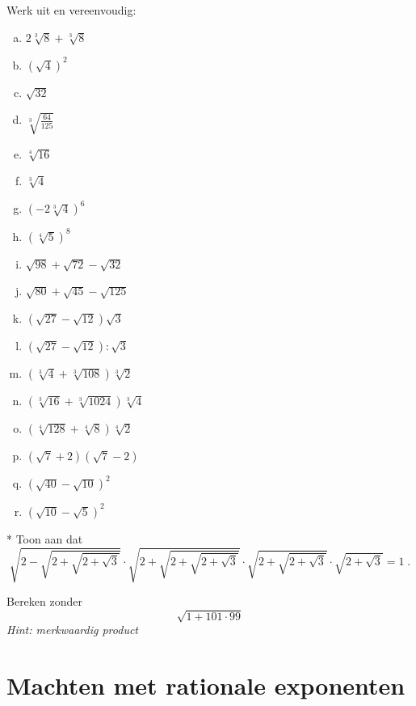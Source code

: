 \documentclass[12pt,twoside,a4paper]{article}
\begin{document}
\begin{oefening}
Werk uit en vereenvoudig:
\begin{multicols}{3}
\begin{enumerate}[(a)]
  \itemsep1em
  \item $2\sqrt[3]{8}+\sqrt[3]{8}$
  \item $\left(\sqrt{4}\right)^2$
  \item $\sqrt{32}$
  \item $\sqrt[3]{\frac{64}{125}}$
  \item $\sqrt[4]{16}$
  \item $\sqrt[3]{4}$
  \item $\left(-2\sqrt[3]{4}\right)^6$
  \item $\left(\sqrt[4]{5}\right)^8$
  \item $\sqrt{98}+\sqrt{72}-\sqrt{32}$
  \item $\sqrt{80}+\sqrt{45}-\sqrt{125}$
  \item $\left(\sqrt{27}-\sqrt{12}\right)\sqrt{3}$
  \item $\left(\sqrt{27}-\sqrt{12}\right):\sqrt{3}$
  \item $\left(\sqrt[3]{4}+\sqrt[3]{108}\right)\sqrt[3]{2}$
  \item $\left(\sqrt[3]{16}+\sqrt[3]{1024}\right)\sqrt[3]{4}$
  \item $\left(\sqrt[4]{128}+\sqrt[4]{8}\right)\sqrt[4]{2}$
  \item $\left(\sqrt{7}+2\right)\left(\sqrt{7}-2\right)$
  \item $\left(\sqrt{40}-\sqrt{10}\right)^2$
  \item $\left(\sqrt{10}-\sqrt{5}\right)^2$
\end{enumerate}
\end{multicols}
\end{oefening}

\begin{oefening}*
Toon aan dat
$$\sqrt{2-\sqrt{2+\sqrt{2+\sqrt{3}}}}\cdot\sqrt{2+\sqrt{2+\sqrt{2+\sqrt{3}}}}\cdot\sqrt{2+\sqrt{2+\sqrt{3}}}\cdot\sqrt{2+\sqrt{3}} = 1\;.$$
\end{oefening}

\begin{oefening}
Bereken zonder 
$$\sqrt{1+101\cdot99}$$
{\em Hint: merkwaardig product}
\end{oefening}

\cleardoublepage
\section{Machten met rationale exponenten}
\end{document}
